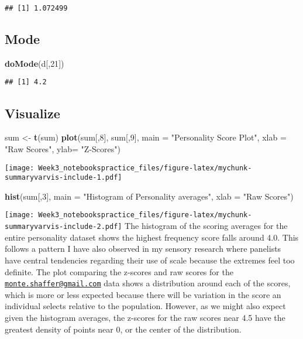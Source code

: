 \documentclass{article}
\newenvironment{Shaded}{\begin{snugshade}}{\end{snugshade}}
\newcommand{\DataTypeTok}[1]{\textcolor[rgb]{0.13,0.29,0.53}{#1}}
\newcommand{\DecValTok}[1]{\textcolor[rgb]{0.00,0.00,0.81}{#1}}
\newcommand{\KeywordTok}[1]{\textcolor[rgb]{0.13,0.29,0.53}{\textbf{#1}}}
\newcommand{\NormalTok}[1]{#1}
\newcommand{\StringTok}[1]{\textcolor[rgb]{0.31,0.60,0.02}{#1}}
\begin{document}
\begin{verbatim}
## [1] 1.072499
\end{verbatim}

\hypertarget{mode}{%
\subsection{Mode}\label{mode}}

\begin{Shaded}
\begin{Highlighting}[]
\KeywordTok{doMode}\NormalTok{(d[,}\DecValTok{21}\NormalTok{])}
\end{Highlighting}
\end{Shaded}

\begin{verbatim}
## [1] 4.2
\end{verbatim}

\hypertarget{visualize}{%
\subsection{Visualize}\label{visualize}}

\begin{Shaded}
\begin{Highlighting}[]
\NormalTok{sum \textless{}{-}}\StringTok{ }\KeywordTok{t}\NormalTok{(sum)}
\KeywordTok{plot}\NormalTok{(sum[,}\DecValTok{8}\NormalTok{], sum[,}\DecValTok{9}\NormalTok{], }\DataTypeTok{main =} \StringTok{"Personality Score Plot"}\NormalTok{, }\DataTypeTok{xlab =} \StringTok{"Raw Scores"}\NormalTok{, }\DataTypeTok{ylab=} \StringTok{"Z{-}Scores"}\NormalTok{)}
\end{Highlighting}
\end{Shaded}

\texttt{[image: Week3\_notebookspractice\_files/figure-latex/mychunk-summaryvarvis-include-1.pdf]}

\begin{Shaded}
\begin{Highlighting}[]
\KeywordTok{hist}\NormalTok{(sum[,}\DecValTok{3}\NormalTok{], }\DataTypeTok{main =} \StringTok{"Histogram of Personality averages"}\NormalTok{, }\DataTypeTok{xlab =} \StringTok{"Raw Scores"}\NormalTok{)}
\end{Highlighting}
\end{Shaded}

\texttt{[image: Week3\_notebookspractice\_files/figure-latex/mychunk-summaryvarvis-include-2.pdf]}
The histogram of the scoring averages for the entire personality dataset
shows the highest frequency score falls around 4.0. This follows a
pattern I have also observed in my sensory research where panelists have
central tendencies regarding their use of scale because the extremes
feel too definite. The plot comparing the z-scores and raw scores for
the
\href{mailto:monte.shaffer@gmail.com}{\nolinkurl{monte.shaffer@gmail.com}}
data shows a distribution around each of the scores, which is more or
less expected because there will be variation in the score an individual
selects relative to the population. However, as we might also expect
given the histogram averages, the z-scores for the raw scores near 4.5
have the greatest density of points near 0, or the center of the
distribution.
\end{document}
